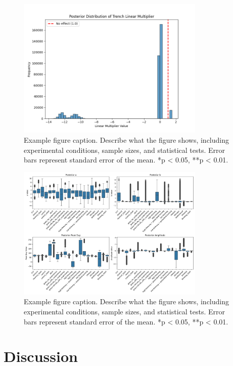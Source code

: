 \documentclass[12pt,a4paper]{article}
\begin{document}
\begin{figure}[H]
    \centering
    \includegraphics[width=0.8\textwidth]{"../linear_multiplier.png"}
    \caption{Example figure caption. Describe what the figure shows, including experimental conditions, sample sizes, and statistical tests. Error bars represent standard error of the mean. *p < 0.05, **p < 0.01.}
    \label{fig:linear_mult}
\end{figure}



\begin{figure}[H]
    \centering
    \includegraphics[width=0.8\textwidth]{"../other_params.png"}
    \caption{Example figure caption. Describe what the figure shows, including experimental conditions, sample sizes, and statistical tests. Error bars represent standard error of the mean. *p < 0.05, **p < 0.01.}
    \label{fig:other_params}
\end{figure}



\section{Discussion}
\end{document}
